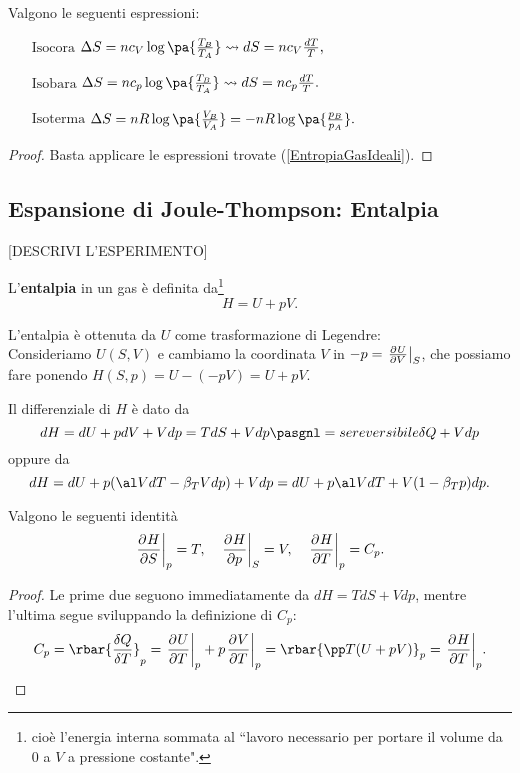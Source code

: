 \begin{proposition}
Valgono le seguenti espressioni:

\begin{itemize}
\item[$\boxed{\text{Isocora}}$] $\Delta S=nc_V\log\pa{\frac{T_B}{T_A}}\leadsto dS=nc_V\frac{dT}T,$
\item[$\boxed{\text{Isobara}}$] $\Delta S=nc_p\log\pa{\frac{T_B}{T_A}}\leadsto dS=nc_p\frac{dT}T.$
\item[$\boxed{\text{Isoterma}}$] $\Delta S=nR\log\pa{\frac{V_B}{V_A}}=-nR\log\pa{\frac{p_B}{p_A}}.$
\end{itemize}
\end{proposition}
\begin{proof}
Basta applicare le espressioni trovate (\ref{EntropiaGasIdeali}).
\end{proof}



\subsection{Espansione di Joule-Thompson: Entalpia}

[DESCRIVI L'ESPERIMENTO]

\begin{definition}[Entalpia]
L'\textbf{entalpia} in un gas \`e definita da\footnote{cio\`e l'energia interna sommata al ``lavoro necessario per portare il volume da $0$ a $V$ a pressione costante".}
\[H=U+pV.\]
\end{definition}

\begin{remark}
L'entalpia \`e ottenuta da $U$ come trasformazione di Legendre:\\
Consideriamo $U(S,V)$ e cambiamo la coordinata $V$ in $-p=\ppb VUS$, che possiamo fare ponendo $H(S,p)=U-(-pV)=U+pV$.
\end{remark}

\begin{remark}
Il differenziale di $H$ \`e dato da
\[dH=dU+pdV+Vdp=TdS+Vdp\pasgnl={se reversibile}\delta Q+Vdp\]
oppure da
\[dH=dU+p(\al VdT-\beta_T Vdp)+Vdp=dU+p\al VdT+V(1-\beta_Tp)dp.\]
\end{remark}
\begin{corollary}
Valgono le seguenti identit\`a
\[\ppb SHp=T,\quad \ppb pHS=V,\quad \ppb THp=C_p.\]
\end{corollary}
\begin{proof}
Le prime due seguono immediatamente da $dH=TdS+Vdp$, mentre l'ultima segue sviluppando la definizione di $C_p$:
\[C_p=\rbar{\frac{\delta Q}{\delta T}}_p=\ppb TUp+p\ppb TVp=\rbar{\pp T{}(U+pV)}_p=\ppb THp.\]
\end{proof}




